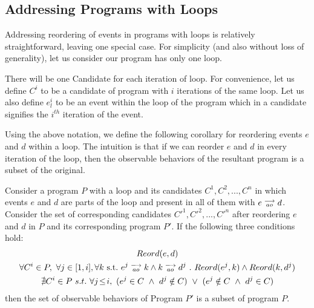 \subsection{Addressing Programs with Loops}
        
        Addressing reordering of events in programs with loops is relatively straightforward, leaving one special case. 
        For simplicity (and also without loss of generality), let us consider our program has only one loop.

        There will be one Candidate for each iteration of loop. 
        For convenience, let us define $C^i$ to be a candidate of program with $i$ iterations of the same loop. 
        Let us also define $e_l^i$ to be an event within the loop of the program which in a candidate signifies the $i^{th}$ iteration of the event. 

        Using the above notation, we define the following corollary for reordering events $e$ and $d$ within a loop.
        The intuition is that if we can reorder $e$ and $d$ in every iteration of the loop, then the observable behaviors of the resultant program is a subset of the original. 
        \begin{corollary}
            Consider a program $P$ with a loop and its candidates $C^1, C^2, ... , C^n$ in which events $e$ and $d$ are parts of the loop and present in all of them with $e\stackrel{\longrightarrow}{_{ao}}d$. 
            Consider the set of corresponding candidates $C'^1, C'^2, ... , C'^n$ after reordering $e$ and $d$ in $P$ and its corresponding program $P'$. 
            If the following three conditions hold:
            \begin{gather*}
                Reord(e, d) \label{reord:loops1}\\ 
                \forall C^i \in P , \ \forall j \in [1,i], \forall k \ \text{s.t.} \ \reln{e^j}{ao}{k} \wedge \reln{k}{ao}{d^j} \ . \ Reord(e^j, k) \wedge Reord(k, d^j) \label{reord:loops2} \\ 
                \nexists C^i \in P \ s.t. \ 
                    \forall j\!\leq\!i , \ (e^j \in C \ \wedge \ d^j \notin C) \ \vee \ 
                    (e^j \notin C \ \wedge \ d^j \in C) \label{reord:loops3}
            \end{gather*}
            then the set of observable behaviors of Program $P'$ is a subset of program $P$.     
        \end{corollary}

